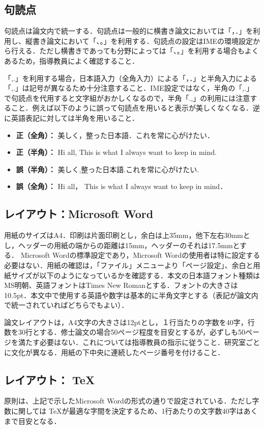 \documentclass[a4paper,uplatex]{jsarticle}
\begin{document}
\subsection{句読点}
句読点は論文内で統一する．句読点は一般的に横書き論文においては「，．」を利用し、縦書き論文において「、。」を利用する．句読点の設定はIMEの環境設定から行える．ただし横書きであっても分野によっては「、。」を利用する場合もよくあるため，指導教員によく確認すること．

「,.」を利用する場合，日本語入力（全角入力）による「，．」と半角入力による「,.」は記号が異なるため十分注意すること．IME設定ではなく，半角の「,.」で句読点を代用すると文字組がおかしくなるので，半角「.,」の利用には注意すること．例えば以下のように誤って句読点を用いると表示が美しくなくなる．逆に英語表記に対しては半角を用いること．
\begin{itemize}
    \item \textbf{正（全角）：} 美しく，整った日本語．これを常に心がけたい．
    \item \textbf{正（半角）：} Hi all, This is what I always want to keep in mind.
    \item \textbf{誤（半角）：} 美しく,整った日本語.これを常に心がけたい.
    \item \textbf{誤（全角）：} Hi all， This is what I always want to keep in mind．
\end{itemize}

\subsection{レイアウト：Microsoft Word}
用紙のサイズはA4．印刷は片面印刷とし，余白は上35mm，他下左右30mmとし，ヘッダーの用紙の端からの距離は15mm，ヘッダーのそれは17.5mmとする．
Microsoft Wordの標準設定であり，Microsoft Wordの使用者は特に設定する必要はない．用紙の確認は，「ファイル」メニューより「ページ設定」、余白と用紙サイズが以下のようになっているかを確認する．本文の日本語フォント種類はMS明朝、英語フォントはTimes New Romanとする．フォントの大きさは10.5pt．本文中で使用する英語や数字は基本的に半角文字とする（表記が論文内で統一されていればどちらでもよい）．

論文レイアウトは，A4文字の大きさは12ptとし，１行当たりの字数を40字，行数を30行とする．修士論文の場合50ページ程度を目安とするが，必ずしも50ページを満たす必要はない．これについては指導教員の指示に従うこと．研究室ごとに文化が異なる．用紙の下中央に連続したページ番号を付けること．

\subsection{レイアウト： \TeX}
原則は、上記で示したMicrosoft Wordの形式の通りで設定されている．ただし字数に関しては \TeX が最適な字間を決定するため、1行あたりの文字数40字はあくまで目安となる．
\end{document}
